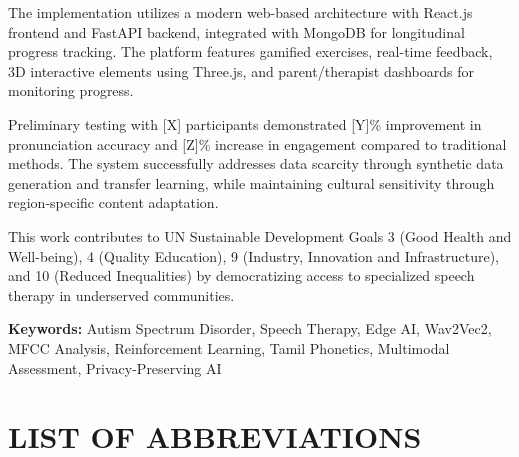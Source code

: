 \documentclass[12pt,a4paper]{article}
\begin{document}
The implementation utilizes a modern web-based architecture with React.js frontend and FastAPI backend, integrated with MongoDB for longitudinal progress tracking. The platform features gamified exercises, real-time feedback, 3D interactive elements using Three.js, and parent/therapist dashboards for monitoring progress.

Preliminary testing with [X] participants demonstrated [Y]\% improvement in pronunciation accuracy and [Z]\% increase in engagement compared to traditional methods. The system successfully addresses data scarcity through synthetic data generation and transfer learning, while maintaining cultural sensitivity through region-specific content adaptation.

This work contributes to UN Sustainable Development Goals 3 (Good Health and Well-being), 4 (Quality Education), 9 (Industry, Innovation and Infrastructure), and 10 (Reduced Inequalities) by democratizing access to specialized speech therapy in underserved communities.

\textbf{Keywords:} Autism Spectrum Disorder, Speech Therapy, Edge AI, Wav2Vec2, MFCC Analysis, Reinforcement Learning, Tamil Phonetics, Multimodal Assessment, Privacy-Preserving AI

\newpage
\tableofcontents

\newpage
\listoffigures
{}

\newpage
\listoftables
{}

\newpage
\section*{LIST OF ABBREVIATIONS}
\end{document}
